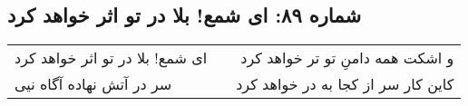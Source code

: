 \begin{center}
\section*{شماره ۸۹: ای شمع! بلا در تو اثر خواهد کرد}
\label{sec:089}
\begin{longtable}{l p{0.5cm} r}
ای شمع! بلا در تو اثر خواهد کرد
&&
و اشکت همه دامنِ تو تر خواهد کرد
\\
سر در آتش نهاده آگاه نیی
&&
کاین کار سر از کجا به در خواهد کرد
\\
\end{longtable}
\end{center}
